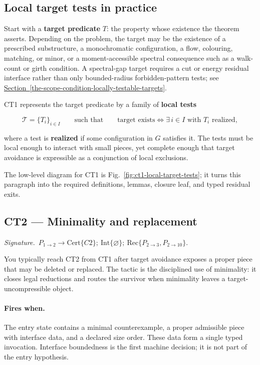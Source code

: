 \documentclass[
  11pt,
]{article}
\theoremstyle{definition}
\newcommand{\secref}[1]{\hyperref[#1]{Section~\ref*{#1}}}
\newcommand{\ctsignature}[1]{\par\noindent\emph{Signature.}\ #1\par\medskip}
\newcommand{\ctcert}[1]{\mathrm{Cert}\{#1\}}
\newcommand{\ctint}[1]{\mathrm{Int}\{#1\}}
\newcommand{\ctrec}[1]{\mathrm{Rec}\{#1\}}
\newcommand{\ctnone}{\varnothing}
\newcommand{\ctpar}[1]{\paragraph{#1.}}
\begin{document}
\subsection*{Local target tests in practice}

Start with a \textbf{target predicate} \(T\): the property whose
existence the theorem asserts. Depending on the problem, the target may
be the existence of a prescribed substructure, a monochromatic
configuration, a flow, colouring, matching, or minor, or a
moment-accessible spectral consequence such as a walk-count or girth
condition. A spectral-gap target requires a cut or energy residual
interface rather than only bounded-radius forbidden-pattern tests; see
\secref{the-scope-condition-locally-testable-targets}.

CT1 represents the target predicate by a family of
\textbf{local tests}

\[
\mathcal T = \{T_i\}_{i\in I}
\qquad\text{such that}\qquad
\text{target exists} \iff \exists\, i \in I \text{ with } T_i \text{ realized},
\]

where a test is \textbf{realized} if some configuration in \(G\)
satisfies it. The tests must be local enough to interact with small
pieces, yet complete enough that target avoidance is expressible as a
conjunction of local exclusions.

The low-level diagram for CT1 is Fig.~\ref{fig:ct1-local-target-tests};
it turns this paragraph into the required definitions, lemmas, closure
leaf, and typed residual exits.



\subsection{CT2 --- Minimality and replacement}\label{ct:2}\label{minimal-counterexample}
\ctsignature{\(P_{1\to2}\to \ctcert{C2};\ \ctint{\ctnone};\ \ctrec{P_{2\to3},P_{2\to10}}\).}

You typically reach CT2 from CT1 after target avoidance exposes a proper
piece that may be deleted or replaced.  The tactic is the disciplined use
of minimality: it closes legal reductions and routes the survivor when
minimality leaves a target-uncompressible object.

\ctpar{Fires when}
The entry state contains a minimal counterexample, a proper admissible
piece with interface data, and a declared size order.  These data form a
single typed invocation.  Interface boundedness is the first machine
decision; it is not part of the entry hypothesis.
\end{document}
